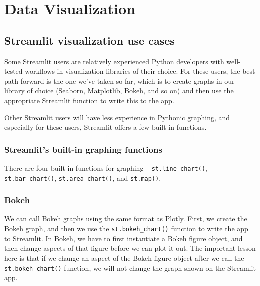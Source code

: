 \chapter{Data Visualization\label{ch03}}
\section{}
\section{Streamlit visualization use cases}
Some Streamlit users are relatively experienced Python developers with well-tested workflows in visualization libraries of their choice. For these users, the best path forward is the one we’ve taken so far, which is to create graphs in our library of choice (Seaborn, Matplotlib, Bokeh, and so on) and then use the appropriate Streamlit function to write this to the app.

Other Streamlit users will have less experience in Pythonic graphing, and especially for these users, Streamlit offers a few built-in functions.

\subsection{Streamlit’s built-in graphing functions}
There are four built-in functions for graphing – \verb|st.line_chart()|, \verb|st.bar_chart()|, \verb|st.area_chart()|, and \verb|st.map()|.
\subsection{Bokeh}
We can call Bokeh graphs using the same format as Plotly. First, we create the Bokeh graph, and then we use the \verb|st.bokeh_chart()| function to write the app to Streamlit. In Bokeh, we have to first instantiate a Bokeh figure object, and then change aspects of that figure before we can plot it out. The important lesson here is that if we change an aspect of the Bokeh figure object after we call the \verb|st.bokeh_chart()| function, we will not change the graph shown on the Streamlit app.